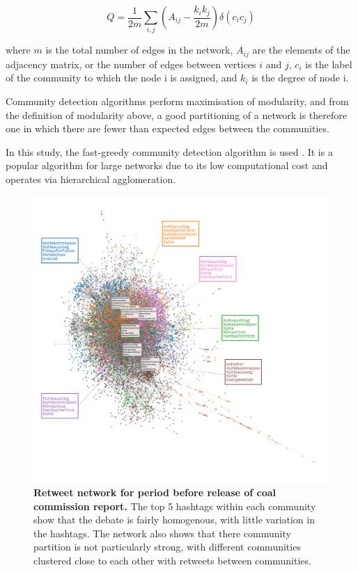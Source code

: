 \documentclass[12pt,onecolumn,twoside]{layout}
\begin{document}
\begin{equation}
\label{eq:modularity}
Q = \frac{1}{2m} \sum_{i,j} \left(A_{ij} - \frac{k_i k_j} {2m}\right) \delta (c_i c_j)
\end{equation}

where $m$ is the total number of edges in the network, $A_{ij}$ are the elements of the adjacency matrix, or the number of edges between vertices $i$ and $j$, $c_i$ is the label of the community to which the node i is assigned, and $k_i$ is the degree of node i.

Community detection algorithms perform maximisation of modularity, and from the definition of modularity above, a good partitioning of a network is therefore one in which there are fewer than expected edges between the communities.

In this study, the fast-greedy community detection algorithm is used \citep{Clauset2004}. It is a popular algorithm for large networks due to its low computational cost and operates via hierarchical agglomeration.

\begin{figure}
	\begin{center}
		\includegraphics[width=\linewidth]{figures/rt_network_ht_period4_edited2}
	\end{center}
	\caption{\textbf{Retweet network for period before release of coal commission report.} The top 5 hashtags within each community show that the debate is fairly homogenous, with little variation in the hashtags. The network also shows that there community partition is not particularly strong, with different communities clustered close to each other with retweets between communities.}
	\label{fig:rt_network_bef}
\end{figure}
\end{document}
